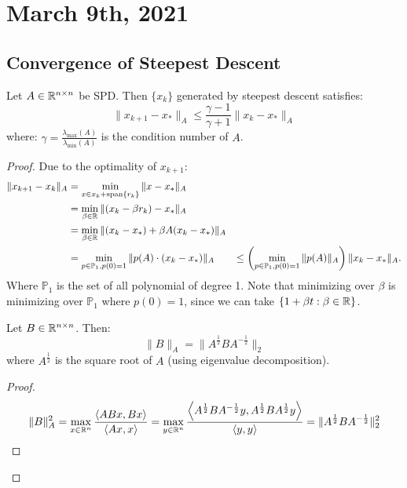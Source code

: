 \documentclass[../main/main.tex]{subfiles}
\begin{document}
\section{March 9th, 2021}
\subsection{Convergence of Steepest Descent}
\begin{theorem}
  Let $A \in \mathbb{R} ^{n\times n}$ be SPD. Then $\{x_{k}\}$ generated by steepest descent satisfies: \[
\|x_{k+1}-x_{*}\|_{A} \leq \frac{\gamma -1}{\gamma +1} \|x_{k}-x_{*}\|_{A}
  \]  where: $\gamma  = \frac{\lambda _{\max }(A)}{\lambda _{\min }(A)} $ is the condition number of $A$.
\end{theorem}
  \begin{proof}
    Due to the optimality of $x_{k+1}$: \begin{align*}
                                          \|x_{k+1}-x_{k}\|_{A} &= \min _{x\in x_{k}+\operatorname{span} \{r_{k}\}} \|x-x_{*}\|_{A}\\
                                                                &= \min _{\beta \in \mathbb{R} }\|(x_{k}-\beta r_{k})- x_{*}\|_{A}\\
                                                                &=\min _{\beta \in \mathbb{R} }\|(x_{k}-x_{*})+\beta A(x_{k}-x_{*})\| _{A} \\
                                                                &=\min _{p\in \mathbb{P}_{1}, p(0)=1} \|p(A)\cdot (x_{k}-x_{*})\|_{A}
                                                                &\leq \left(\min _{p\in \mathbb{P}_{1}, p(0)=1} \|p(A)\|_{A}\right) \|x_{k}-x_{*}\|_{A}
                                          .\end{align*}
                                        Where $\mathbb{P}_{1} $ is the set of all polynomial of degree 1. Note that minimizing over $\beta $ is minimizing over $\mathbb{P}_{1}$ where $p(0)=1$, since we can take $\{1+\beta t : \beta \in \mathbb{R} \}$.
  \begin{lemma}
    Let $B\in \mathbb{R} ^{n\times n}$. Then: \[
      \|B\|_{A} = \|A^{\frac{1}{2}}B A^{-\frac{1}{2}}\|_{2}
    \] where $A^{\frac{1}{2}}$ is the square root of $A$ (using eigenvalue decomposition).
  \end{lemma}
  \begin{proof}
    \[
      \|B\|_{A}^2 = \max _{x\in \mathbb{R} ^{n}} \frac{\left\langle{ABx},{Bx}\right\rangle}{\left\langle{Ax},{x}\right\rangle}  = \max_{y\in \mathbb{R} ^{n}} \frac{\left\langle{A^{\frac{1}{2}}BA^{-\frac{1}{2}}y},{A^{\frac{1}{2}}B A^{\frac{1}{2}}y}\right\rangle}{\left\langle{y},{y}\right\rangle}  = \|A^{\frac{1}{2}}B A^{-\frac{1}{2}}\|^2_{2}
\]
\end{proof}
\end{proof}
\end{document}
